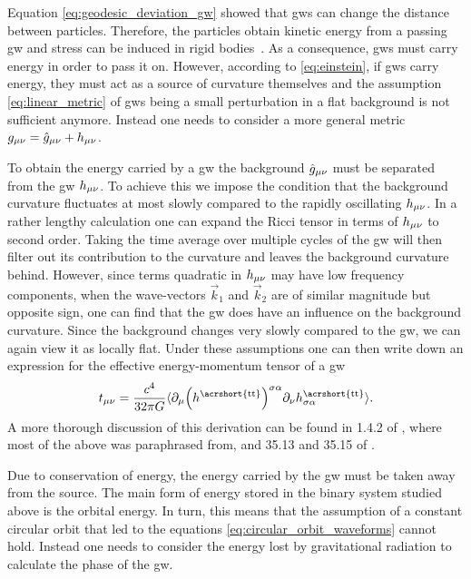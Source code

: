 Equation \eqref{eq:geodesic_deviation_gw} showed that \acrshort{gw}s can change the distance between particles. Therefore, the particles obtain kinetic energy from a passing \acrshort{gw} and stress can be induced in rigid bodies~\cite{Maggiore:2008aaa}. %
As a consequence, \acrshort{gw}s must carry energy in order to pass it on. However, according to \eqref{eq:einstein}, if \acrshort{gw}s carry energy, they must act as a source of curvature themselves and the assumption \eqref{eq:linear_metric} of \acrshort{gw}s being a small perturbation in a flat background is not sufficient anymore. Instead one needs to consider a more general metric $g_{\mu\nu}=\hat{g}_{\mu\nu}+h_{\mu\nu}$.

To obtain the energy carried by a \acrshort{gw} the background $\hat{g}_{\mu\nu}$ must be separated from the \acrshort{gw} $h_{\mu\nu}$. To achieve this we impose the condition that the background curvature fluctuates at most slowly compared to the rapidly oscillating $h_{\mu\nu}$. In a rather lengthy calculation one can expand the Ricci tensor in terms of $h_{\mu\nu}$ to second order. Taking the time average over multiple cycles of the \acrshort{gw} will then filter out its contribution to the curvature and leaves the background curvature behind. However, since terms quadratic in $h_{\mu\nu}$ may have low frequency components, when the wave-vectors $\vec{k}_1$ and $\vec{k}_2$ are of similar magnitude but opposite sign, one can find that the \acrshort{gw} does have an influence on the background curvature. Since the background changes very slowly compared to the \acrshort{gw}, we can again view it as locally flat. Under these assumptions one can then write down an expression for the effective energy-momentum tensor of a \acrshort{gw}
\begin{equation}
t_\mn=\frac{c^4}{32\pi G}\langle\partial_\mu \lr{h^{\text{\acrshort{tt}}}}^{\sigma\alpha}\partial_\nu h^{\text{\acrshort{tt}}}_{\sigma\alpha}\rangle .
\end{equation}
A more thorough discussion of this derivation can be found in 1.4.2 of \cite{Maggiore:2008aaa}, where most of the above was paraphrased from, and 35.13 and 35.15 of \cite{Misner:1973aaa}.

Due to conservation of energy, the energy carried by the \acrshort{gw} must be taken away from the source. The main form of energy stored in the binary system studied above is the orbital energy. In turn, this means that the assumption of a constant circular orbit that led to the equations \eqref{eq:circular_orbit_waveforms} cannot hold. Instead one needs to consider the energy lost by gravitational radiation to calculate the phase of the \acrshort{gw}. 

